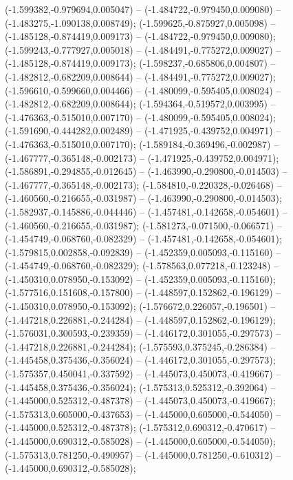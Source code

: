  (-1.599382,-0.979694,0.005047) -- (-1.484722,-0.979450,0.009080) -- (-1.483275,-1.090138,0.008749);
 (-1.599625,-0.875927,0.005098) -- (-1.485128,-0.874419,0.009173) -- (-1.484722,-0.979450,0.009080);
 (-1.599243,-0.777927,0.005018) -- (-1.484491,-0.775272,0.009027) -- (-1.485128,-0.874419,0.009173);
 (-1.598237,-0.685806,0.004807) -- (-1.482812,-0.682209,0.008644) -- (-1.484491,-0.775272,0.009027);
 (-1.596610,-0.599660,0.004466) -- (-1.480099,-0.595405,0.008024) -- (-1.482812,-0.682209,0.008644);
 (-1.594364,-0.519572,0.003995) -- (-1.476363,-0.515010,0.007170) -- (-1.480099,-0.595405,0.008024);
 (-1.591690,-0.444282,0.002489) -- (-1.471925,-0.439752,0.004971) -- (-1.476363,-0.515010,0.007170);
 (-1.589184,-0.369496,-0.002987) -- (-1.467777,-0.365148,-0.002173) -- (-1.471925,-0.439752,0.004971);
 (-1.586891,-0.294855,-0.012645) -- (-1.463990,-0.290800,-0.014503) -- (-1.467777,-0.365148,-0.002173);
 (-1.584810,-0.220328,-0.026468) -- (-1.460560,-0.216655,-0.031987) -- (-1.463990,-0.290800,-0.014503);
 (-1.582937,-0.145886,-0.044446) -- (-1.457481,-0.142658,-0.054601) -- (-1.460560,-0.216655,-0.031987);
 (-1.581273,-0.071500,-0.066571) -- (-1.454749,-0.068760,-0.082329) -- (-1.457481,-0.142658,-0.054601);
 (-1.579815,0.002858,-0.092839) -- (-1.452359,0.005093,-0.115160) -- (-1.454749,-0.068760,-0.082329);
 (-1.578563,0.077218,-0.123248) -- (-1.450310,0.078950,-0.153092) -- (-1.452359,0.005093,-0.115160);
 (-1.577516,0.151608,-0.157800) -- (-1.448597,0.152862,-0.196129) -- (-1.450310,0.078950,-0.153092);
 (-1.576672,0.226057,-0.196501) -- (-1.447218,0.226881,-0.244284) -- (-1.448597,0.152862,-0.196129);
 (-1.576031,0.300593,-0.239359) -- (-1.446172,0.301055,-0.297573) -- (-1.447218,0.226881,-0.244284);
 (-1.575593,0.375245,-0.286384) -- (-1.445458,0.375436,-0.356024) -- (-1.446172,0.301055,-0.297573);
 (-1.575357,0.450041,-0.337592) -- (-1.445073,0.450073,-0.419667) -- (-1.445458,0.375436,-0.356024);
 (-1.575313,0.525312,-0.392064) -- (-1.445000,0.525312,-0.487378) -- (-1.445073,0.450073,-0.419667);
 (-1.575313,0.605000,-0.437653) -- (-1.445000,0.605000,-0.544050) -- (-1.445000,0.525312,-0.487378);
 (-1.575312,0.690312,-0.470617) -- (-1.445000,0.690312,-0.585028) -- (-1.445000,0.605000,-0.544050);
 (-1.575313,0.781250,-0.490957) -- (-1.445000,0.781250,-0.610312) -- (-1.445000,0.690312,-0.585028);
